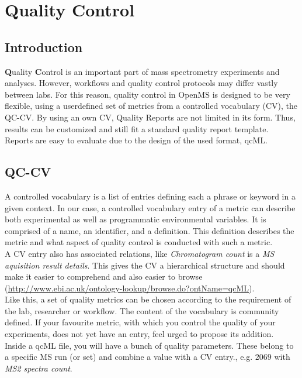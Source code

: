 
\newpage
\section{Quality Control}
\label{Quality Control}

\subsection{Introduction}

\textbf{Q}uality \textbf{C}ontrol is an important part of  mass spectrometry experiments and analyses. However, workflows and quality control protocols may differ vastly between labs. For this reason, quality control in OpenMS is designed to be very flexible, using a userdefined set of metrics from a controlled vocabulary (CV), the QC-CV. By using an own CV, Quality Reports are not limited in its form. Thus, results can be customized and still fit a standard quality report template. Reports are  easy to evaluate due to the design of the used format, qcML.


\subsection{QC-CV}
A controlled vocabulary is a list of entries defining each a phrase or keyword in a given context. In our case, a controlled vocabulary entry of a metric can describe both experimental as well as programmatic environmental variables. It is comprised of a name, an identifier, and a definition. This definition describes the metric and what aspect of quality control is conducted with such a metric. \\
A CV entry also has associated relations, like \textit{Chromatogram count} is a \textit{MS aquisition result details}. This gives the CV a hierarchical structure and should make it easier to comprehend and also easier to browse (\url{http://www.ebi.ac.uk/ontology-lookup/browse.do?ontName=qcML}). \\
Like this, a set of quality metrics can be chosen according to the requirement of the lab, researcher or workflow. The content of the vocabulary is community defined. If your favourite metric, with which you control the quality of your experiments, does not yet have an entry, feel urged to propose its addition. \\
Inside a qcML file, you will have a bunch of quality parameters. These belong to a specific MS run (or set) and combine a value with a CV entry., e.g. $2069$ with \textit{MS2 spectra count}.

